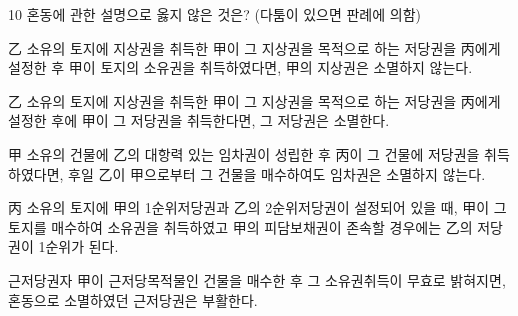 \begin{question}{10}
혼동에 관한 설명으로 옳지 않은 것은? (다툼이 있으면 판례에 의함)
\begin{choices}
  \item 乙 소유의 토지에 지상권을 취득한 甲이 그 지상권을 목적으로 하는 저당권을 丙에게 설정한 후 甲이 토지의 소유권을 취득하였다면, 甲의 지상권은 소멸하지 않는다.
  \item 乙 소유의 토지에 지상권을 취득한 甲이 그 지상권을 목적으로 하는 저당권을 丙에게 설정한 후에 甲이 그 저당권을 취득한다면, 그 저당권은 소멸한다.
  \item 甲 소유의 건물에 乙의 대항력 있는 임차권이 성립한 후 丙이 그 건물에 저당권을 취득하였다면, 후일 乙이 甲으로부터 그 건물을 매수하여도 임차권은 소멸하지 않는다.
  \item 丙 소유의 토지에 甲의 1순위저당권과 乙의 2순위저당권이 설정되어 있을 때, 甲이 그 토지를 매수하여 소유권을 취득하였고 甲의 피담보채권이 존속할 경우에는 乙의 저당권이 1순위가 된다.
  \item 근저당권자 甲이 근저당목적물인 건물을 매수한 후 그 소유권취득이 무효로 밝혀지면, 혼동으로 소멸하였던 근저당권은 부활한다.
\end{choices}
\end{question}
